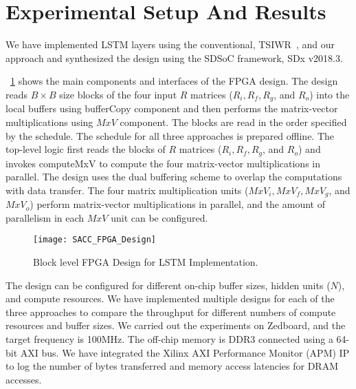 \section{Experimental Setup And Results}
We have implemented LSTM layers using the conventional, TSIWR~\cite{park2020time}, and our approach and synthesized the design using the SDSoC framework, SDx v2018.3. 
\figurename{~\ref{fig:lstmFpgaDesign} shows the main components and interfaces of the FPGA design. The design reads $B{\times}B$ size blocks of the four input $R$ matrices ($R_i, R_f, R_g$, and $R_o$) into the local buffers using bufferCopy component and then performs the matrix-vector multiplications using $MxV$ component. The blocks are read in the order specified by the schedule. The schedule for all three approaches is prepared offline. The top-level logic first reads the blocks of $R$ matrices ($R_i, R_f, R_g$, and $R_o$) and invokes computeMxV to compute the four matrix-vector multiplications in parallel. The design uses the dual buffering scheme to overlap the computations with data transfer. The four matrix multiplication units ($MxV_i, MxV_f, MxV_g$, and $MxV_o$) perform matrix-vector multiplications in parallel, and the amount of parallelism in each $MxV$ unit can be configured. 
\begin{figure}[!htb]
	\centering
	\texttt{[image: SACC\_FPGA\_Design]}
	\caption{Block level FPGA Design for LSTM Implementation.}
	\label{fig:lstmFpgaDesign}
\end{figure}

The design can be configured for different on-chip buffer sizes, hidden units ($N$), and compute resources. We have implemented multiple designs for each of the three approaches to compare the throughput for different numbers of compute resources and buffer sizes. We carried out the experiments on Zedboard, and the target frequency is 100MHz. The off-chip memory is DDR3 connected using a 64-bit AXI bus. We have integrated the Xilinx AXI Performance Monitor (APM) IP to log the number of bytes transferred and memory access latencies for DRAM accesses.

}
